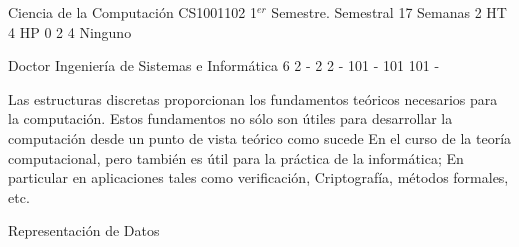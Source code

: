 \documentclass[a4paper,8pt]{article}
\begin{document}
\setNombreProfesor{}
\setGradoProfesorAbreviado{}
\sylabusHeader

\academicaTable
{Ciencia de la Computación} %
{CS1001102} %
{1$^{er}$ Semestre.} %
{Semestral} %
{17 Semanas} %
{2 HT} %
{4 HP} %
{0} %
{}  %
{2} %
{4} %
{Ninguno} %

\administrativaTable
{Doctor} %
{Ingeniería de Sistemas e Informática} %
{6} %
{2} %
{-} %
{2} %
{2} %
{-} %
{101} %
{-} %
{101} %
{101} %
{-} %


\begin{fundamentacion}
Las estructuras discretas proporcionan los fundamentos teóricos necesarios para la computación. Estos fundamentos no sólo son útiles para desarrollar la computación desde un punto de vista teórico como sucede
En el curso de la teoría computacional, pero también es útil para la práctica de la informática; En particular en aplicaciones tales como verificación,
Criptografía, métodos formales, etc.

\end{fundamentacion}

\begin{sumilla}
\item \DSSetsRelationsandFunctions
\item \DSBasicLogic
\item \DSProofTechniques
\item Representación de Datos

\end{sumilla}

\begin{competenciasAsignatura}
\item {}
\item {}

\end{competenciasAsignatura}
\end{document}
